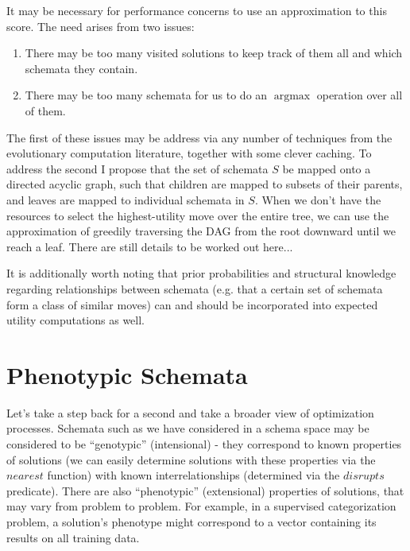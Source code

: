 \documentclass[letterpaper]{article}
\DeclareMathOperator*{\argmax}{argmax}
\begin{document}
It may be necessary for performance concerns to use an approximation to this
score. The need arises from two issues:

\begin{enumerate}
\item There may be too many visited solutions to keep track of them all and
  which schemata they contain.
\item There may be too many schemata for us to do an $\argmax$ operation over
  all of them.
\end{enumerate}

The first of these issues may be address via any number of techniques from the
evolutionary computation literature, together with some clever caching. To
address the second I propose that the set of schemata $S$ be mapped onto a
directed acyclic graph, such that children are mapped to subsets of their
parents, and leaves are mapped to individual schemata in $S$. When we don't
have the resources to select the highest-utility move over the entire tree, we
can use the approximation of greedily traversing the DAG from the root downward
until we reach a leaf. There are still details to be worked out here...

It is additionally worth noting that prior probabilities and structural
knowledge regarding relationships between schemata (e.g. that a certain set of
schemata form a class of similar moves) can and should be incorporated into
expected utility computations as well.

\section{Phenotypic Schemata}

Let's take a step back for a second and take a broader view of optimization
processes. Schemata such as we have considered in a schema space may be
considered to be ``genotypic'' (intensional) - they correspond to known
properties of solutions (we can easily determine solutions with these
properties via the $nearest$ function) with known interrelationships
(determined via the $disrupts$ predicate). There are also ``phenotypic''
(extensional) properties of solutions, that may vary from problem to
problem. For example, in a supervised categorization problem, a solution's
phenotype might correspond to a vector containing its results on all training
data.
\end{document}
